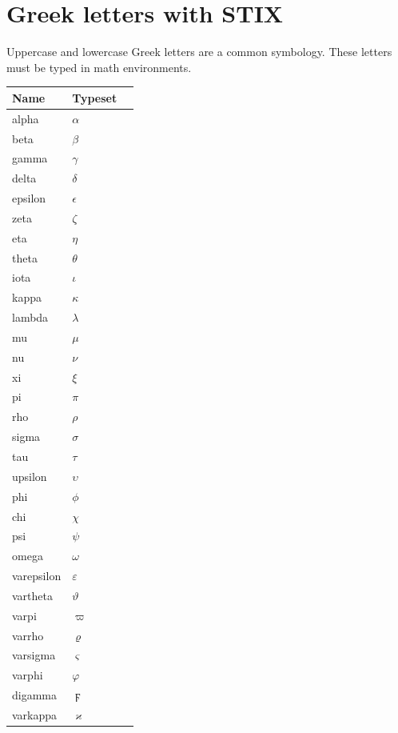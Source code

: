\documentclass{sample}
\begin{document}
\section{Greek letters with STIX}
Uppercase and lowercase Greek letters are a common symbology. These letters must be typed in math environments.

\begin{center}
	\begin{tabular}{llc}
	\toprule
	Name & Typeset \\
	\midrule
	alpha & $\alpha$\\
	beta & $\beta$\\
	gamma & $\gamma$\\
	delta & $\delta$\\
	epsilon & $\epsilon$\\
	zeta & $\zeta$\\
	eta & $\eta$\\
	theta & $\theta$\\
	iota & $\iota$\\
	kappa & $\kappa$\\
	lambda & $\lambda$\\
	mu & $\mu$\\
	nu & $\nu$\\
	xi & $\xi$\\
	pi & $\pi$\\
	rho & $\rho$\\
	sigma & $\sigma$\\
	tau & $\tau$\\
	upsilon & $\upsilon$\\
	phi & $\phi$\\
	chi & $\chi$\\
	psi & $\psi$\\
	omega & $\omega$\\
	varepsilon & $\varepsilon$\\
	vartheta & $\vartheta$\\
	varpi & $\varpi$\\
	varrho & $\varrho$\\
	varsigma & $\varsigma$\\
	varphi & $\varphi$\\
	digamma & $\digamma$\\
	varkappa & $\varkappa$\\
	\bottomrule
	\end{tabular}
	\label{Ta:lowgreek}
\end{center}
\end{document}
